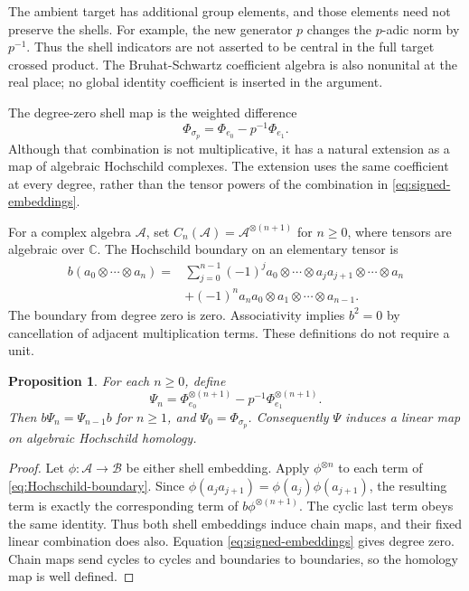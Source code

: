 \documentclass[11pt,letterpaper]{article}
\newtheorem{proposition}[theorem]{Proposition}
\theoremstyle{definition}
\theoremstyle{remark}
\newcommand{\C}{\mathbb C}
\begin{document}
The ambient target has additional group elements, and those
elements need not preserve the shells. For example, the new
generator $p$ changes the $p$-adic norm by $p^{-1}$.
Thus the shell indicators are not asserted to be central
in the full target crossed product. The Bruhat-Schwartz
coefficient algebra is also nonunital at the real place;
no global identity coefficient is inserted in the argument.

The degree-zero shell map is the weighted difference
\begin{equation}\label{eq:signed-embeddings}
 \Phi_{\sigma_p}=\Phi_{e_0}-p^{-1}\Phi_{e_1}.
\end{equation}
Although that combination is not multiplicative, it has a
natural extension as a map of algebraic Hochschild complexes.
The extension uses the same coefficient at every degree,
rather than the tensor powers of the combination in
\eqref{eq:signed-embeddings}.

For a complex algebra $\mathcal A$, set
$C_n(\mathcal A)=\mathcal A^{\otimes(n+1)}$ for $n\ge0$,
where tensors are algebraic over $\C$. The Hochschild boundary
on an elementary tensor is
\begin{align}
 b(a_0\otimes\cdots\otimes a_n)
 ={}&\sum_{j=0}^{n-1}(-1)^j
 a_0\otimes\cdots\otimes a_ja_{j+1}\otimes\cdots\otimes a_n
 \nonumber\\
 &+(-1)^n a_na_0\otimes a_1\otimes\cdots\otimes a_{n-1}.
 \label{eq:Hochschild-boundary}
\end{align}
The boundary from degree zero is zero. Associativity implies
$b^2=0$ by cancellation of adjacent multiplication terms.
These definitions do not require a unit.

\begin{proposition}\label{prop:corrected-chain-map}
For each $n\ge0$, define
\begin{equation}\label{eq:corrected-chain-map}
 \Psi_n=\Phi_{e_0}^{\otimes(n+1)}
                -p^{-1}\Phi_{e_1}^{\otimes(n+1)}.
\end{equation}
Then $b\Psi_n=\Psi_{n-1}b$ for $n\ge1$, and
$\Psi_0=\Phi_{\sigma_p}$. Consequently $\Psi$ induces a
linear map on algebraic Hochschild homology.
\end{proposition}

\begin{proof}
Let $\phi:\mathcal A\to\mathcal B$ be either shell
embedding. Apply $\phi^{\otimes n}$ to each term of
\eqref{eq:Hochschild-boundary}. Since
$\phi(a_ja_{j+1})=\phi(a_j)\phi(a_{j+1})$, the resulting
term is exactly the corresponding term of
$b\phi^{\otimes(n+1)}$. The cyclic last term obeys the
same identity. Thus both shell embeddings induce chain
maps, and their fixed linear combination does also.
Equation \eqref{eq:signed-embeddings} gives degree zero.
Chain maps send cycles to cycles and boundaries to
boundaries, so the homology map is well defined.
\end{proof}
\end{document}
